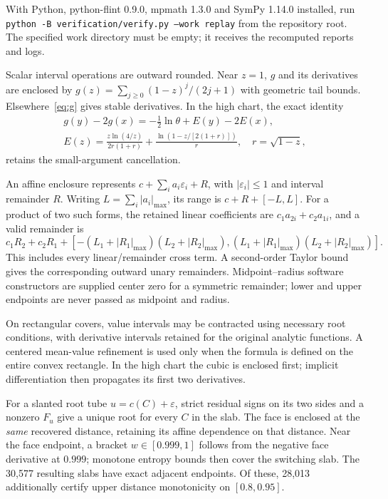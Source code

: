 \documentclass[12pt,letterpaper,onecolumn]{article}
\theoremstyle{definition}
\begin{document}
With Python, python-flint 0.9.0, mpmath 1.3.0 and SymPy 1.14.0 installed, run
\texttt{python -B verification/verify.py --work replay}
from the repository root. The specified work directory must be empty; it receives the recomputed reports and logs.

Scalar interval operations are outward rounded. Near \(z=1\), \(g\) and its derivatives are enclosed by
\(g(z)=\sum_{j\ge0}(1-z)^j/(2j+1)\) with geometric tail bounds. Elsewhere~\eqref{eq:g} gives stable derivatives. In the high chart, the exact identity
\begin{gather*}
g(y)-2g(x)=-\tfrac12\ln\theta+E(y)-2E(x),\\
E(z)=\frac{z\ln(4/z)}{2r(1+r)}
+\frac{\ln(1-z/[2(1+r)])}{r},\quad r=\sqrt{1-z},
\end{gather*}
retains the small-argument cancellation.

An affine enclosure represents \(c+\sum_i a_i\varepsilon_i+R\), with
\(|\varepsilon_i|\le1\) and interval remainder \(R\).
Writing \(L=\sum_i|a_i|_{\max}\), its range is \(c+R+[-L,L]\).
For a product of two such forms, the retained linear coefficients are
\(c_1a_{2i}+c_2a_{1i}\), and a valid remainder is
\[
c_1R_2+c_2R_1+
[-(L_1+|R_1|_{\max})(L_2+|R_2|_{\max}),
  (L_1+|R_1|_{\max})(L_2+|R_2|_{\max})].
\]
This includes every linear/remainder cross term.
A second-order Taylor bound gives the corresponding outward unary remainders.
Midpoint--radius software constructors are supplied center zero for a symmetric remainder; lower and upper endpoints are never passed as midpoint and radius.

On rectangular covers, value intervals may be contracted using necessary root conditions, with derivative intervals retained for the original analytic functions.
A centered mean-value refinement is used only when the formula is defined on the entire convex rectangle.
In the high chart the cubic is enclosed first; implicit differentiation then propagates its first two derivatives.

For a slanted root tube \(u=c(C)+\varepsilon\), strict residual signs on its two sides and a nonzero \(F_u\) give a unique root for every \(C\) in the slab.
The face is enclosed at the \emph{same} recovered distance, retaining its affine dependence on that distance.
Near the face endpoint, a bracket \(w\in[0.999,1]\) follows from the negative face derivative at \(0.999\); monotone entropy bounds then cover the switching slab.
The 30,577 resulting slabs have exact adjacent endpoints. Of these, 28,013 additionally certify upper distance monotonicity on \([0.8,0.95]\).
\end{document}
